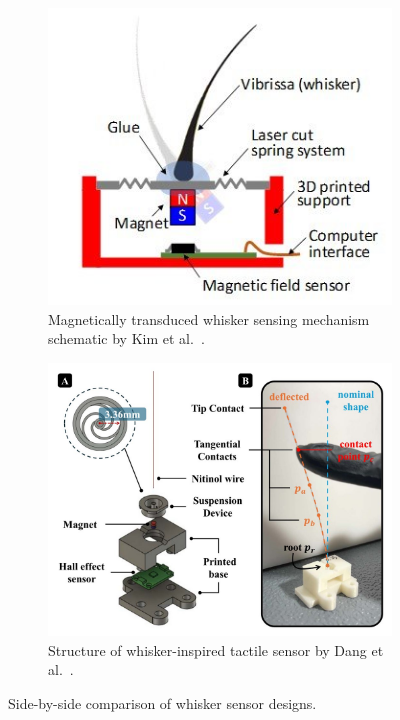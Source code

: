 \begin{figure}[htb]
    \centering
    \begin{subfigure}{0.48\textwidth}
        \centering
        \includegraphics[width=\textwidth]{figures/kim-velez-whisker}
        \caption{Magnetically transduced whisker sensing mechanism schematic by Kim et al.~\cite{8968518}.}
        \label{fig:kim-whisker}
    \end{subfigure}\hfill
    \begin{subfigure}{0.48\textwidth}
        \centering
        \includegraphics[width=\textwidth]{figures/dang-whisker}
        \caption{Structure of whisker-inspired tactile sensor by Dang et al.~\cite{dang2025whisker}.}
        \label{fig:dang-whisker}
    \end{subfigure}
    \caption{Side-by-side comparison of whisker sensor designs.}
\end{figure}

